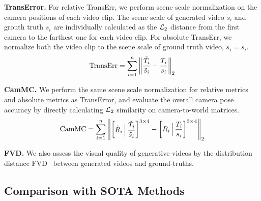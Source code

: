\noindent\textbf{TransError.} For relative TransErr, we perform scene scale normalization on the camera positions of each video clip.
The scene scale of generated video \(\tilde{s}_i\) and grouth truth \(s_i\) are individually calculated as the \({\cal L}_2\) distance from the first camera to the farthest one for each video clip.
For absolute TransErr, we normalize both the video clip to the scene scale of ground truth video, \ie \(\tilde{s}_i=s_i\).
\begin{equation}
    {\rm TransErr} = \sum_{i=1}^n{\left\Vert \frac{\tilde{T}_{i}}{\tilde{s}_i} - \frac{T_{i}}{s_i} \right\Vert_2}
\end{equation}

\noindent\textbf{CamMC.} We perform the same scene scale normalization for relative metrics and absolute metrics as TransError, and evaluate the overall camera pose accuracy by directly calculating \({\cal L}_2\) similarity on camera-to-world matrices.
\begin{equation}
    {\rm CamMC} = \sum_{i=1}^n{\left\Vert \begin{bmatrix} \tilde{R}_i \,\Big|\, \dfrac{\tilde{T}_{i}}{\tilde{s}_i} \end{bmatrix}^{3\times4} - \begin{bmatrix} R_i \,\Big|\, \dfrac{T_{i}}{s_i} \end{bmatrix}^{3\times4} \right\Vert_2}
\end{equation}


\noindent\textbf{FVD.} We also assess the visual quality of generative videos by the distribution distance FVD~\cite{Unterthiner2018} between generated videos and ground-truths.


\subsection{Comparison with SOTA Methods}


